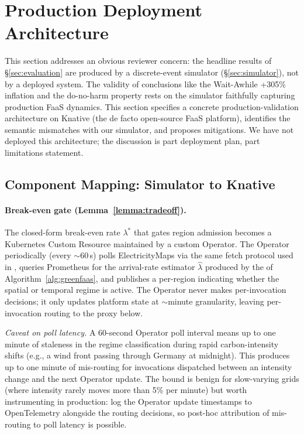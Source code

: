 \section{Production Deployment Architecture}
\label{sec:deployment}

This section addresses an obvious reviewer concern: the headline
results of \S\ref{sec:evaluation} are produced by a discrete-event
simulator (\S\ref{sec:simulator}), not by a deployed system. The
validity of conclusions like the Wait-Awhile +305\% inflation and
the do-no-harm property rests on the simulator faithfully capturing
production FaaS dynamics. This section specifies a concrete
production-validation architecture on Knative (the de facto
open-source FaaS platform), identifies the semantic mismatches with
our simulator, and proposes mitigations. We have not deployed this
architecture; the discussion is part deployment plan, part
limitations statement.

\subsection{Component Mapping: Simulator to Knative}
\label{sec:deployment:mapping}

\paragraph{Break-even gate (Lemma~\ref{lemma:tradeoff}).}
The closed-form break-even rate $\lambda^*$ that gates region
admission becomes a Kubernetes Custom Resource maintained by a
custom Operator. The Operator periodically (every $\sim 60$\,s) polls
ElectricityMaps via the same fetch protocol used in
, queries Prometheus for the
arrival-rate estimator $\hat\lambda$ produced by the
 of Algorithm~\ref{alg:greenfaas}, and
publishes a per-region  indicating whether the
spatial or temporal regime is active. The Operator never makes
per-invocation decisions; it only updates platform state at
$\sim$minute granularity, leaving per-invocation routing to the
proxy below.

\emph{Caveat on poll latency.} A 60-second Operator poll interval
means up to one minute of staleness in the regime classification
during rapid carbon-intensity shifts (e.g., a wind front passing
through Germany at midnight). This produces up to one minute of
mis-routing for invocations dispatched between an intensity change
and the next Operator update. The bound is benign for slow-varying
grids (where intensity rarely moves more than 5\% per minute) but
worth instrumenting in production: log the Operator update timestamps
to OpenTelemetry alongside the routing decisions, so post-hoc
attribution of mis-routing to poll latency is possible.

